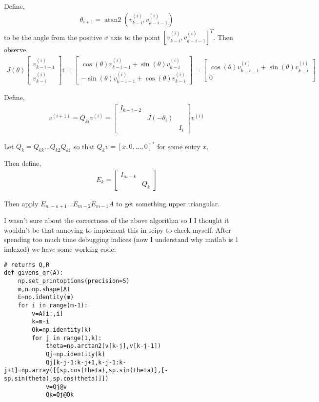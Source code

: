 \documentclass[10pt]{article}
\begin{document}
\begin{solution}[Solution]
\begin{enumerate}
        Define, 
        \begin{align*}
            \theta_{i+1}=\operatorname{atan2}(v^{(i)}_{k-i},v^{(i)}_{k-i-1})
        \end{align*}
        to be the angle from the positive \( x \) axis to the point \( [v^{(i)}_{k-i},v^{(i)}_{k-i-1}]^T \). 
        Then observe,
        \begin{align*}
            J(\theta)\left[\begin{array}{c}v^{(i)}_{k-i-1}\\v^{(i)}_{k-i}\end{array}\right] i
                = \left[\begin{array}{c}\cos(\theta)v^{(i)}_{k-i-1}+\sin(\theta)v^{(i)}_{k-i}\\ -\sin(\theta)v^{(i)}_{k-i-1}+\cos(\theta)v^{(i)}_{k-i}\end{array}\right]
                = \left[\begin{array}{c}\cos(\theta)v^{(i)}_{k-i-1}+\sin(\theta)v^{(i)}_{k-i}\\ 0 \end{array}\right]
        \end{align*} 

        Define,
        \begin{align*}
            v^{(i+1)} = Q_{ki}v^{(i)}=\left[\begin{array}{ccc}I_{k-i-2} \\ & J(-\theta_i) \\ & & I_{i}\end{array}\right]v^{(i)} 
        \end{align*}
        
        Let \( Q_k=Q_{kk}...Q_{k2}Q_{k1} \) so that \( Q_kv = [x,0,...,0]^* \) for some entry \( x \).

        Then define,
        \begin{align*}
            E_{k} = \left[\begin{array}{cc}I_{m-k}\\&Q_k\end{array}\right]
        \end{align*}

        Then apply \( E_{m-n+1}...E_{m-2}E_{m-1} A \) to get something upper triangular.


        I wasn't sure about the correctness of the above algorithm so I I thought it wouldn't be that annoying to implement this in scipy to check myself. After spending too much time debugging indices (now I understand why matlab is 1 indexed) we have some working code:
\begin{lstlisting}
# returns Q,R
def givens_qr(A):
    np.set_printoptions(precision=5)
    m,n=np.shape(A)
    E=np.identity(m)
    for i in range(m-1):
        v=A[i:,i]
        k=m-i
        Qk=np.identity(k)
        for j in range(1,k):
            theta=np.arctan2(v[k-j],v[k-j-1])
            Qj=np.identity(k)
            Qj[k-j-1:k-j+1,k-j-1:k-j+1]=np.array([[sp.cos(theta),sp.sin(theta)],[-sp.sin(theta),sp.cos(theta)]])
            v=Qj@v
            Qk=Qj@Qk
        

\end{lstlisting}
\end{enumerate}
\end{solution}
\end{document}
